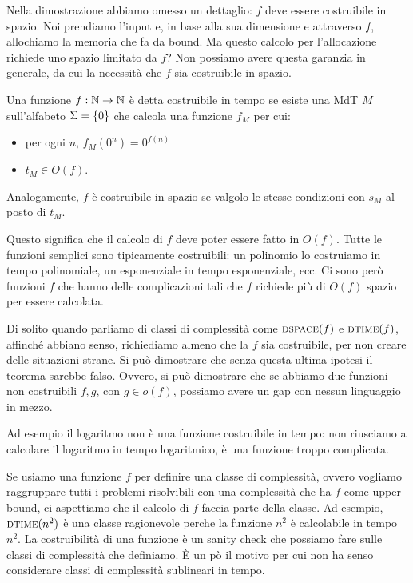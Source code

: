 Nella dimostrazione abbiamo omesso un dettaglio: $f$ deve essere costruibile in spazio. Noi
prendiamo l'input e, in base alla sua dimensione e attraverso $f$, allochiamo la memoria che fa da
bound. Ma questo calcolo per l'allocazione richiede uno spazio limitato da $f$? Non possiamo avere
questa garanzia in generale, da cui la necessità che $f$ sia costruibile in spazio.

\begin{defn}
    Una funzione $f:\mathbb{N} \to \mathbb{N}$ è detta costruibile in tempo se esiste una MdT $M$ sull'alfabeto
    $\Sigma = \left\{0\right\}$ che calcola una funzione $f_{M}$ per cui:
    \begin{itemize}
        \item per ogni $n$, $f_{M}(0^{n}) = 0^{f(n)}$
        \item $t_{M} \in O(f)$.
    \end{itemize}
    Analogamente, $f$ è costruibile in spazio se valgolo le stesse condizioni con $s_{M}$ al posto
    di $t_{M}$.
\end{defn}

Questo significa che il calcolo di $f$ deve poter essere fatto in $O(f)$. Tutte le funzioni
semplici sono tipicamente costruibili: un polinomio lo costruiamo in tempo polinomiale, un
esponenziale in tempo esponenziale, ecc. Ci sono però funzioni $f$ che hanno delle
complicazioni tali che $f$ richiede più di $O(f)$ spazio per essere calcolata.

Di solito quando parliamo di classi di complessità come $\textsc{dspace}(f)$ e $\textsc{dtime}(f)$, affinché
abbiano senso, richiediamo almeno che la $f$ sia costruibile, per non creare delle situazioni
strane.  Si può dimostrare che senza questa ultima ipotesi il teorema sarebbe falso. Ovvero, si
può dimostrare che se abbiamo due funzioni non costruibili $f,g$, con $g \in o(f)$, possiamo avere
un gap con nessun linguaggio in mezzo.

%
Ad esempio il logaritmo non è una funzione costruibile in tempo: non riusciamo a calcolare il
logaritmo in tempo logaritmico, è una funzione troppo complicata.

Se usiamo una funzione $f$ per definire una classe di complessità, ovvero vogliamo
raggruppare tutti i problemi risolvibili con una complessità che ha $f$ come upper bound, ci
aspettiamo che il calcolo di $f$ faccia parte della classe. Ad esempio, $\textsc{dtime}(n^{2})$ è una
classe ragionevole perche la funzione $n^{2}$ è calcolabile in tempo $n^{2}$. La costruibilità di
una funzione è un sanity check che possiamo fare sulle classi di complessità che definiamo. È un
pò il motivo per cui non ha senso considerare classi di complessità sublineari in tempo.

